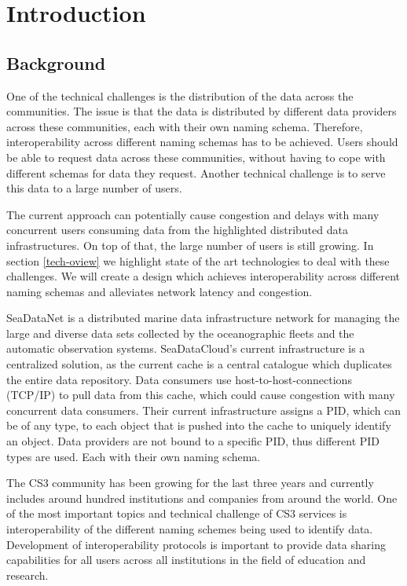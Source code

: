 \section{Introduction}

\subsection{Background}
\label{introduction-background}


One of the technical challenges is the distribution of the data across the communities. The issue is that the data is distributed by different data providers across these communities, each with their own
naming schema. Therefore, interoperability across different naming schemas has to be achieved. Users should be able to request data across these communities, without having to cope with different schemas for data they request. Another technical challenge is to serve this data to a large number of users. 

The current approach can potentially cause congestion and delays with
many concurrent users consuming data from the highlighted distributed data infrastructures. On top of that, the large number of users is still growing. In section \ref{tech-oview} we highlight state of the art technologies to deal with these challenges. We will create a design which achieves interoperability across different naming schemas and alleviates network latency and congestion.

SeaDataNet is a distributed marine data infrastructure network for managing the large and diverse data sets collected by the oceanographic fleets and the automatic observation systems.
SeaDataCloud's current infrastructure is a centralized solution, as the current cache is a central catalogue which duplicates the entire data repository. Data consumers use host-to-host-connections (TCP/IP) to pull data from this cache, which could cause congestion with many concurrent data consumers.
Their current infrastructure assigns a PID, which can be of any type, to each object that is pushed into the cache to uniquely identify an object. Data providers are not bound to a specific PID, thus different PID types are used. Each with their own naming schema.
 
The CS3 community has been growing for the last three years and currently includes around hundred institutions and companies from around the world. One of the most important topics and technical challenge of CS3 services is interoperability of the different naming schemes being used to identify data. Development of interoperability protocols is important to provide data sharing capabilities for all users across all institutions in the field of education and research.



